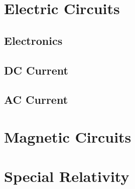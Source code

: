 \documentclass{book}
\theoremstyle{definition}
\theoremstyle{remark}
\begin{document}
\chapter{Electric Circuits}
\section{Electronics}
\section{DC Current}
\section{AC Current}
\chapter{Magnetic Circuits}
\chapter{Special Relativity}

\nocite{griffem,jackson,landau2,zangwillem}
\printbibliography
\end{document}
